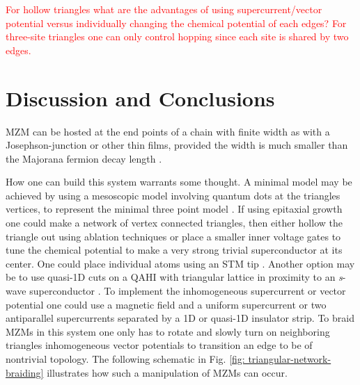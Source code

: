\documentclass[aps,prb,showpacs,amsmath,twocolumn,amssymb,superscriptaddress]{revtex4-2}
\newcommand{\Red}[1]{\textcolor{red}{#1}}
\begin{document}
\Red{For hollow triangles what are the advantages of using supercurrent/vector potential versus individually changing the chemical potential of each edges? For three-site triangles one can only control hopping since each site is shared by two edges.}

\section{Discussion and Conclusions}

MZM can be hosted at the end points of a chain with finite width as with a Josephson-junction or other thin films, provided the width is much smaller than the Majorana fermion decay length \cite{black-schafferMajoranaFermionsSpinorbitcoupled2011, pientkaSignaturesTopologicalPhase2013, hellTwoDimensionalPlatformNetworks2017, scharfTuningTopologicalSuperconductivity2019, potterMultichannelGeneralizationKitaev2010}.

How one can build this system warrants some thought.
A minimal model may be achieved by using a mesoscopic model involving quantum dots at the triangles vertices, to represent the minimal three point model \cite{dvirRealizationMinimalKitaev2023}.
If using epitaxial growth \cite{pietzschSpinResolvedElectronicStructure2006} one could make a network of vertex connected triangles, then either hollow the triangle out using ablation techniques or place a smaller inner voltage gates to tune the chemical potential to make a very strong trivial superconductor at its center.
One could place individual atoms using an STM tip \cite{schneiderPrecursorsMajoranaModes2022}.
Another option may be to use quasi-1D cuts on a QAHI with triangular lattice in proximity to an \textit{s}-wave superconductor \cite{xieCreatingLocalizedMajorana2021}.
To implement the inhomogeneous supercurrent or vector potential one could use a magnetic field and a uniform supercurrent or two antiparallel supercurrents separated by a 1D or quasi-1D insulator strip.
To braid MZMs in this system one only has to rotate and slowly turn on neighboring triangles inhomogeneous vector potentials to transition an edge to be of nontrivial topology.
The following schematic in Fig. \ref{fig: triangular-network-braiding} illustrates how such a manipulation of MZMs can occur.
\end{document}
